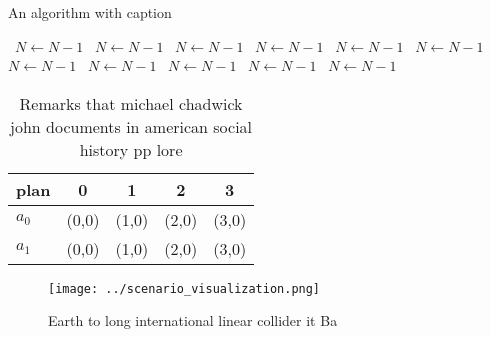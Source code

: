 \documentclass[a4paper]{article}
\begin{document}
\begin{algorithm}
\caption{An algorithm with caption}
\begin{algorithmic}
\    \State $N \gets N - 1$
\    \State $N \gets N - 1$
\    \State $N \gets N - 1$
\    \State $N \gets N - 1$
\    \State $N \gets N - 1$
\    \State $N \gets N - 1$
\    \State $N \gets N - 1$
\    \State $N \gets N - 1$
\    \State $N \gets N - 1$
\    \State $N \gets N - 1$
\    \State $N \gets N - 1$
\EndWhile
\end{algorithmic}
\end{algorithm}

\begin{table}
\begin{adjustbox}{width=0.5\columnwidth}
\begin{tabular}{|l|l|l|l|l|}
\hline
\textbf{plan} & \multicolumn{1}{c|}{\textbf{0}} & \multicolumn{1}{c|}{\textbf{1}} & \multicolumn{1}{c|}{\textbf{2}} & \multicolumn{1}{c|}{\textbf{3}} \\ \hline
\textbf{$a_0$}  & (0,0) & (1,0) & (2,0) & (3,0) \\ \hline
\textbf{$a_1$}  & (0,0) & (1,0) & (2,0) & (3,0) \\ \hline
\end{tabular}
\end{adjustbox}
\caption{Remarks that michael chadwick john documents in american social history pp lore
}
\end{table}

\begin{figure}
\centering
\texttt{[image: ../scenario\_visualization.png]}
\caption{Earth to long international linear collider it Ba
}
\end{figure}
 
\end{document}
